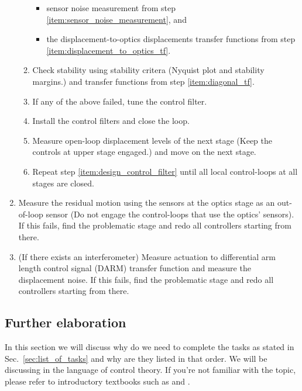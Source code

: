 \begin{enumerate}
\begin{enumerate}
\begin{itemize}
			\item sensor noise measurement from step \ref{item:sensor_noise_measurement}, and
			\item the displacement-to-optics displacements transfer functions from step \ref{item:displacement_to_optics_tf}.
		\end{itemize} 
		\item Check stability using stability critera (Nyquist plot and stability margins.) and transfer functions from step \ref{item:diagonal_tf}.
		\item If any of the above failed, tune the control filter.
		\item Install the control filters and close the loop.
		\item Measure open-loop displacement levels of the next stage (Keep the controls at upper stage engaged.) and move on the next stage. \label{item:open_loop_displacement_levels}
		\item Repeat step \ref{item:design_control_filter} until all local control-loops at all stages are closed.
	\end{enumerate}
	\item Measure the residual motion using the sensors at the optics stage as an out-of-loop sensor (Do not engage the control-loops that use the optics' sensors). If this fails, find the problematic stage and redo all controllers starting from there.
	\item (If there exists an interferometer) Measure actuation to differential arm length control signal (DARM) transfer function and measure the displacement noise. If this fails, find the problematic stage and redo all controllers starting from there.
\end{enumerate}

\subsection{Further elaboration}
In this section we will discuss why do we need to complete the tasks as stated in Sec.~\ref{sec:list_of_tasks} and why are they listed in that order.
We will be discussing in the language of control theory.
If you're not familiar with the topic, please refer to introductory textbooks such as \cite{modern_control_engineering} and \cite{control_engineering}.

